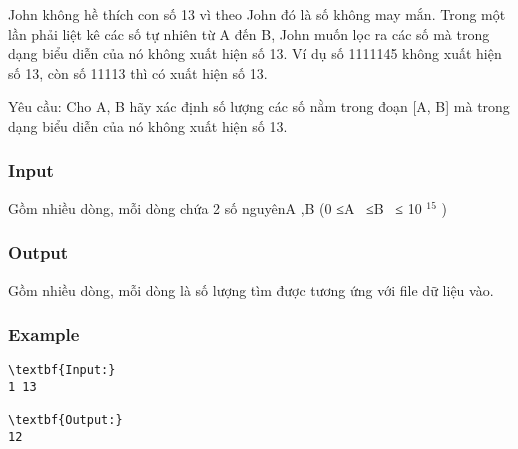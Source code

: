 



   John không hề thích con số 13 vì theo John đó là số không may mắn. Trong một lần phải liệt kê các số tự nhiên từ A đến B, John muốn lọc ra các số mà trong dạng biểu diễn của nó không xuất hiện số 13. Ví dụ số 1111145 không xuất hiện số 13, còn số 11113 thì có xuất hiện số 13.  

   Yêu cầu: Cho A, B hãy xác định số lượng các số nằm trong đoạn [A, B] mà trong dạng biểu diễn của nó không xuất hiện số 13.  

\subsubsection{   Input  }

   Gồm nhiều dòng, mỗi dòng chứa 2 số nguyênA ,B (0 ≤A  ≤B  ≤ 10   $^    15   $   )  

\subsubsection{   Output  }

   Gồm nhiều dòng, mỗi dòng là số lượng tìm được tương ứng với file dữ liệu vào.  

\subsubsection{   Example  }
\begin{verbatim}
\textbf{Input:}
1 13

\textbf{Output:}
12\end{verbatim}
